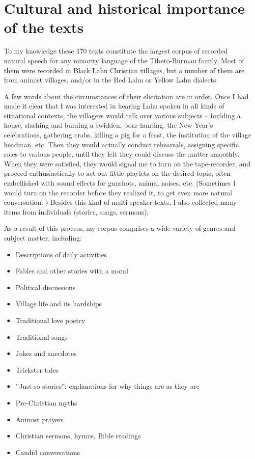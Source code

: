 \section{Cultural and historical importance of the texts}

To my knowledge these 170 texts constitute the largest corpus of recorded natural speech for any minority language of the Tibeto-Burman family. Most of them were recorded in Black Lahu Christian villages, but a number of them are from animist villages, and/or in the Red Lahu or Yellow Lahu dialects. 

A few words about the circumstances of their elicitation are in order. Once I had made it clear that I was interested in hearing Lahu spoken in all kinds of situational contexts, the villagers would talk over various subjects -- building a house, slashing and burning a swidden, boar-hunting, the New Year’s celebrations, gathering crabs, killing a pig for a feast, the institution of the village headman, etc. Then they would actually conduct rehearsals, assigning specific roles to various people, until they felt they could discuss the matter smoothly. When they were satisfied, they would signal me to turn on the tape-recorder, and proceed enthusiastically to act out little playlets on the desired topic, often embellished with sound effects for gunshots, animal noises, etc. (Sometimes I would turn on the recorder before they realized it, to get even more natural conversation. ) Besides this kind of multi-speaker texts, I also collected many items from individuals (stories, songs, sermons).

As a result of this process, my corpus comprises a wide variety of genres and subject matter, including:

\begin{itemize}
\item Descriptions of daily activities
\item Fables and other stories with a moral
\item Political discussions
\item Village life and its hardships
\item Traditional love poetry
\item Traditional songs
\item Jokes  and anecdotes
\item Trickster tales
\item ”Just-so stories”: explanations for why things are as they are
\item Pre-Christian myths
\item Animist prayers
\item Christian sermons, hymns, Bible readings
\item Candid conversations
\end{itemize}

